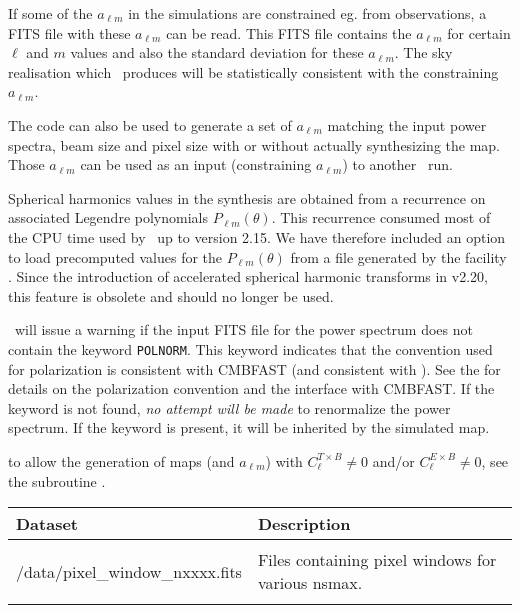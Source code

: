 \begin{codedescription}
{If some of the $a_{\ell m}$ in the simulations are constrained eg. from observations, a FITS file
with these $a_{\ell m}$ can be read. This FITS file contains 
the $a_{\ell m}$ for certain $\ell$ and $m$ values
and also the standard deviation for these $a_{\ell m}$. The sky
realisation which \thedocid\ produces will be statistically consistent
with the constraining $a_{\ell m}$.

The code can also be used
to generate a set of $a_{\ell m}$ matching the input power spectra, beam size and
pixel size with or without actually synthesizing the map. Those $a_{\ell m}$ can be
used as an input (constraining $a_{\ell m}$) to another \thedocid\ run.
\\
}
\end{codedescription}
%
\begin{cd_contd}
{
Spherical harmonics values in the synthesis are obtained from a
recurrence on associated Legendre polynomials $P_{\ell m}(\theta)$. 
This recurrence consumed most of the CPU time used by \thedocid\ up to version
2.15. We have therefore included an option to load precomputed values for the
$P_{\ell m}(\theta)$ from a file generated by the \healpix facility
. Since the introduction of accelerated spherical
harmonic transforms in \healpix v2.20, this feature is obsolete and should no
longer be used. 

\thedocid\ will issue a warning if the input FITS file for the power spectrum does
not contain the keyword {\tt POLNORM}. This keyword indicates that the convention
used for polarization is consistent with CMBFAST (and consistent with ). See the 
for details on the
polarization convention and the interface with CMBFAST. If the
keyword is not found, {\em no attempt will be made} to renormalize the power
spectrum. 
If the keyword is present, it will be inherited by the simulated map.

 to allow the generation of maps (and $a_{\ell m}$) with $C^{T\times B}_{\ell} \ne 0$ and/or $C^{E\times B}_{\ell} \ne 0$,
see the subroutine .
}
\end{cd_contd}


\begin{datasets}
{
\begin{tabular}{p{0.3\hsize} p{0.35\hsize}} \hline  
  \textbf{Dataset} & \textbf{Description} \\ \hline
                   &                      \\ %
  /data/pixel\_window\_nxxxx.fits & Files containing pixel windows for
                   various nsmax.\\ 
                   &                      \\ \hline %
\end{tabular}
} 
\end{datasets}

